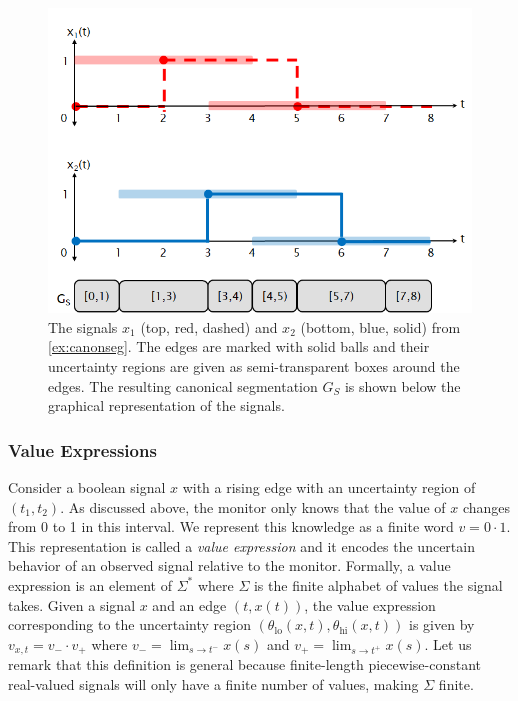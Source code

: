\begin{figure} 
	\centering
	\includegraphics[scale=0.5]{canonseg.png}
	\caption{The signals $x_1$ (top, red, dashed) and $x_2$ (bottom, blue, solid) from \cref{ex:canonseg}. The edges are marked with solid balls and their uncertainty regions are given as semi-transparent boxes around the edges. The resulting canonical segmentation $G_S$ is shown below the graphical representation of the signals.}
	\label{fig:canonseg}
\end{figure}


\subsubsection{Value Expressions}
Consider a boolean signal $x$ with a rising edge with an uncertainty region of $(t_1, t_2)$.
As discussed above, the monitor only knows that the value of $x$ changes from 0 to 1 in this interval.
We represent this knowledge as a finite word $v = 0 \cdot 1$.
This representation is called a \emph{value expression} and it encodes the uncertain behavior of an observed signal relative to the monitor.
Formally, a value expression is an element of $\Sigma^*$ where $\Sigma$ is the finite alphabet of values the signal takes.
Given a signal $x$ and an edge $(t, x(t))$, the value expression corresponding to the uncertainty region $(\theta_{\text{lo}}(x,t), \theta_{\text{hi}}(x,t))$ is given by $v_{x,t} = v_- \cdot v_+$ where $v_- = \lim_{s \to t^-} x(s)$ and $v_+ = \lim_{s \to t^+} x(s)$.
Let us remark that this definition is general because finite-length piecewise-constant real-valued signals will only have a finite number of values, making $\Sigma$ finite.

